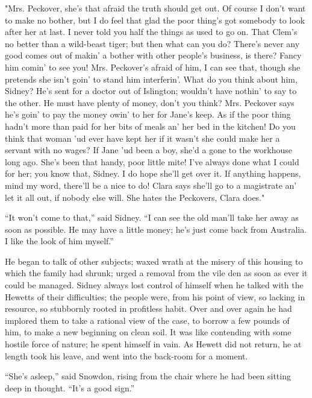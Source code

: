 "Mrs. Peckover, she's that afraid the truth
{\protect\hypertarget{152}{}{}}should get out. Of course I don't want to
make no bother, but I do feel that glad the poor thing's got somebody to
look after her at last. I never told you half the things as used to go
on. That Clem's no better than a wild-beast tiger; but then what can you
do? There's never any good comes out of makin' a bother with other
people's business, is there? Fancy him comin' to see you! Mrs.
Peckover's afraid of him, I can see that, though she pretends she isn't
goin' to stand him interferin'. What do you think about him, Sidney?
He's sent for a doctor out of Islington; wouldn't have nothin' to say to
the other. He must have plenty of money, don't you think? Mrs. Peckover
says he's goin' to pay the money owin' to her for Jane's keep. As if the
poor thing hadn't more than paid for her bits of meals an' her bed in
the kitchen! Do you think that woman 'ud ever have kept her if it wasn't
she could make her a servant with no wages? If Jane 'ud been a boy,
she'd a gone to the workhouse long ago. She's been that handy,
{\protect\hypertarget{153}{}{}}poor little mite! I've always done what I
could for her; you know that, Sidney. I do hope she'll get over it. If
anything happens, mind my word, there'll be a nice to do! Clara says
she'll go to a magistrate an' let it all out, if nobody else will. She
hates the Peckovers, Clara does."

``It won't come to that,'' said Sidney. ``I can see the old man'll take
her away as soon as possible. He may have a little money; he's just come
back from Australia. I like the look of him myself.''

He began to talk of other subjects; waxed wrath at the misery of this
housing to which the family had shrunk; urged a removal from the vile
den as soon as ever it could be managed. Sidney always lost control of
himself when he talked with the Hewetts of their difficulties; the
people were, from his point of view, so lacking in resource, so
stubbornly rooted in profitless habit. Over and over again he had
implored them to take a rational view of the case, to borrow a few
pounds of him, to make a new beginning on clean soil.
{\protect\hypertarget{154}{}{}}It was like contending with some hostile
force of nature; he spent himself in vain. As Hewett did not return, he
at length took his leave, and went into the back-room for a moment.

``She's asleep,'' said Snowdon, rising from the chair where he had been
sitting deep in thought. ``It's a good sign.''

